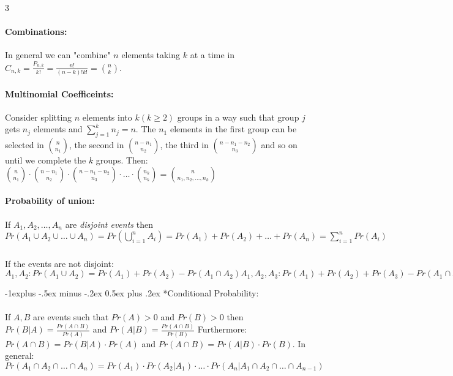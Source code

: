\documentclass[landscape,10pt]{article}
\makeatletter
\renewcommand{\subsection}{\@startsection{subsection}{2}{0mm}%
                                {-1explus -.5ex minus -.2ex}%
                                {0.5ex plus .2ex}%
                                {\normalfont\normalsize\bfseries}}
\makeatother
\begin{document}
\begin{multicols}{3}
        \paragraph*{Combinations: }
            In general we can "combine" $n$ elements taking $k$ at a time in \(C_{n,k} = \frac{P_{n,k}}{k!} = \frac{n!}{(n-k)!k!} = {n \choose k} \). 

        \paragraph*{Multinomial Coefficeints: } 
            Consider splitting $n$ elements into $k (k \geq 2)$ groups in a way such that group $j$ gets $n_j$ elements and $\sum\limits_{j = 1}^{k}n_j = n$. The $n_1$ elements in the first group can be selected in ${n \choose n_1}$, the second in ${n-n_1 \choose n_2}$, the third in ${n-n_1-n_2 \choose n_3}$ and so on until we complete the $k$ groups. Then: ${n \choose n_1}\cdot{n-n_1 \choose n_2}\cdot{n-n_1-n_2 \choose n_3}\cdot \ldots \cdot{n_k \choose n_k} = {n \choose n_1, n_2, \ldots, n_k}$
        \paragraph*{Probability of union:}
            If $A_1, A_2, \ldots, A_n$ are \textit{disjoint events} then 
            \(Pr(A_1 \cup A_2 \cup \ldots \cup A_n) 
            = Pr(\bigcup\limits_{i=1}^{n}A_i) 
            = Pr(A_1) + Pr(A_2) + \ldots + Pr(A_n) 
            = \sum\limits_{i=1}^{n}Pr(A_i) \)
        \subparagraph*{} 
            If the events are not disjoint: 
            \( A_1, A_2: Pr(A_1 \cup A_2) = Pr(A_1) + Pr(A_2) - Pr(A_1 \cap A_2) 
            A_1, A_2, A_3: Pr(A_1) + Pr(A_2) + Pr(A_3) - Pr(A_1 \cap A_2) - Pr(A_1 \cap A_3) - Pr(A_2 \cap A_3) + Pr(A_1 \cap A_2 \cap A_3)\)     
        
    \subsection*{Conditional Probability: }
        \paragraph*{}
            If $A, B$ are events such that $Pr(A) > 0$ and $Pr(B) > 0$ then $Pr(B|A) = \frac{Pr(A\cap B)}{Pr(A)}$ and 
            $Pr(A|B) = \frac{Pr(A \cap B)}{Pr(B)}$ 
            Furthermore: $Pr(A \cap B) = Pr(B|A) \cdot Pr(A)$ and $Pr(A \cap B) = Pr(A|B) \cdot Pr(B)$. In general: $Pr(A_1 \cap A_2 \cap \ldots \cap A_n) = Pr(A_1) \cdot Pr(A_2 | A_1) \cdot \ldots \cdot Pr(A_n | A_1 \cap A_2 \cap \ldots \cap A_{n-1})$

\end{multicols}
\end{document}

